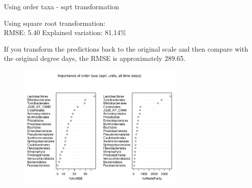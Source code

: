 \documentclass{beamer}
\begin{document}
\begin{frame}{Using order taxa - sqrt transformation}

  {\scriptsize
    
  \noindent Using square root transformation:\\
  RMSE: 5.40  \hspace{0.05in}  Explained variation: 81.14\%

  \vspace{0.05in}
  
  \noindent If you transform the predictions back to the original
  scale and then compare with the original degree days, the RMSE is
  approximately 289.65.
  
\begin{center}
\begin{figure}
  \includegraphics[width=3.25in]{../only_orders/all_time_steps/sqrt_units_all_data_orders_imp_plot}
\end{figure}
\end{center}
\vspace{-0.25in}
}
  
\end{frame}
\end{document}
